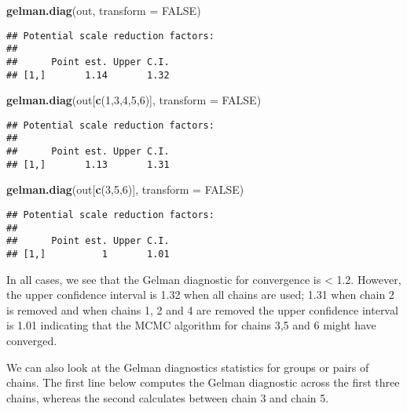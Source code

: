 \documentclass[]{article}
\newenvironment{Shaded}{\begin{snugshade}}{\end{snugshade}}
\newcommand{\KeywordTok}[1]{\textcolor[rgb]{0.13,0.29,0.53}{\textbf{{#1}}}}
\newcommand{\DataTypeTok}[1]{\textcolor[rgb]{0.13,0.29,0.53}{{#1}}}
\newcommand{\DecValTok}[1]{\textcolor[rgb]{0.00,0.00,0.81}{{#1}}}
\newcommand{\OtherTok}[1]{\textcolor[rgb]{0.56,0.35,0.01}{{#1}}}
\newcommand{\NormalTok}[1]{{#1}}
\begin{document}
\begin{Shaded}
\begin{Highlighting}[]
\KeywordTok{gelman.diag}\NormalTok{(out, }\DataTypeTok{transform =} \OtherTok{FALSE}\NormalTok{)}
\end{Highlighting}
\end{Shaded}

\begin{verbatim}
## Potential scale reduction factors:
## 
##      Point est. Upper C.I.
## [1,]       1.14       1.32
\end{verbatim}

\begin{Shaded}
\begin{Highlighting}[]
\KeywordTok{gelman.diag}\NormalTok{(out[}\KeywordTok{c}\NormalTok{(}\DecValTok{1}\NormalTok{,}\DecValTok{3}\NormalTok{,}\DecValTok{4}\NormalTok{,}\DecValTok{5}\NormalTok{,}\DecValTok{6}\NormalTok{)], }\DataTypeTok{transform =} \OtherTok{FALSE}\NormalTok{)}
\end{Highlighting}
\end{Shaded}

\begin{verbatim}
## Potential scale reduction factors:
## 
##      Point est. Upper C.I.
## [1,]       1.13       1.31
\end{verbatim}

\begin{Shaded}
\begin{Highlighting}[]
\KeywordTok{gelman.diag}\NormalTok{(out[}\KeywordTok{c}\NormalTok{(}\DecValTok{3}\NormalTok{,}\DecValTok{5}\NormalTok{,}\DecValTok{6}\NormalTok{)], }\DataTypeTok{transform =} \OtherTok{FALSE}\NormalTok{)}
\end{Highlighting}
\end{Shaded}

\begin{verbatim}
## Potential scale reduction factors:
## 
##      Point est. Upper C.I.
## [1,]          1       1.01
\end{verbatim}

In all cases, we see that the Gelman diagnostic for convergence is
\textless{} 1.2. However, the upper confidence interval is 1.32 when all
chains are used; 1.31 when chain 2 is removed and when chains 1, 2 and 4
are removed the upper confidence interval is 1.01 indicating that the
MCMC algorithm for chains 3,5 and 6 might have converged.

We can also look at the Gelman diagnostics statistics for groups or
pairs of chains. The first line below computes the Gelman diagnostic
across the first three chains, whereas the second calculates between
chain 3 and chain 5.
\end{document}
